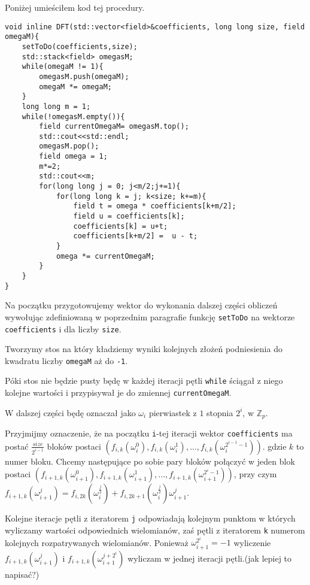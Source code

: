 \documentclass{article}
\begin{document}
Poniżej umieściłem kod tej procedury.

\begin{verbatim}
void inline DFT(std::vector<field>&coefficients, long long size, field omegaM){
    setToDo(coefficients,size);
    std::stack<field> omegasM;
    while(omegaM != 1){
        omegasM.push(omegaM);
        omegaM *= omegaM;
    }
    long long m = 1;
    while(!omegasM.empty()){   
        field currentOmegaM= omegasM.top();
        std::cout<<std::endl;
        omegasM.pop();
        field omega = 1;
        m*=2;
        std::cout<<m;
        for(long long j = 0; j<m/2;j+=1){
            for(long long k = j; k<size; k+=m){
                field t = omega * coefficients[k+m/2];
                field u = coefficients[k];
                coefficients[k] = u+t;
                coefficients[k+m/2] =  u - t;
            }
            omega *= currentOmegaM;
        }
    }
}
\end{verbatim}



Na początku przygotowujemy wektor do wykonania dalszej części obliczeń wywołując zdefiniowaną w poprzednim paragrafie funkcję \texttt{setToDo} na wektorze 
\texttt{coefficients} i dla liczby \texttt{size}. 

Tworzymy stos na który kładziemy wyniki kolejnych złożeń podniesienia do kwadratu liczby \texttt{omegaM} aż do \texttt{-1}.

Póki stos nie będzie pusty będę w każdej iteracji pętli \texttt{while} ściągał z niego kolejne wartości i przypisywał je do zmiennej \texttt{currentOmegaM}.

W dalszej części będę oznaczał jako $\omega_i$ pierwiastek z $1$ stopnia $2^i$, w $\mathbb{Z}_p$.

Przyjmijmy oznaczenie, że na początku \texttt{i}-tej iteracji wektor \texttt{coefficients} ma postać $\frac{size}{2^{i-1}}$ bloków postaci
$(f_{i,k}(\omega_i^0), f_{i,k}(\omega_i^1), ...,f_{i,k}(\omega^{2^{i-1}-1}_i))$. gdzie $k$ to numer bloku. Chcemy
następujące po sobie pary bloków połączyć w jeden blok postaci $(f_{i+1,k}(\omega_{i+1}^0),f_{i+1,k}(\omega_{i+1}^1),...,
f_{i+1,k}(\omega^{2^{i}-1}_{i+1}))$, przy czym 
$f_{i+1,k}(\omega_{i+1}^j) = f_{i,2k}(\omega_{i}^\frac{j}{2})+f_{i,2k+1}(\omega_{i}^{\frac{j}{2}})\omega_{i+1}^j$. 

Kolejne iteracje pętli z iteratorem \texttt{j} odpowiadają kolejnym punktom w których wyliczamy wartości odpowiednich wielomianów, zaś pętli z iteratorem 
\texttt{k}
numerom kolejnych rozpatrywanych wielomianów. Ponieważ $\omega_{i+1}^{2^i}=-1$ wyliczenie $f_{i+1,k}(\omega_{i+1}^{j})$ i $f_{i+1,k}(\omega_{i+1}^{j+2^i})$ 
wyliczam w jednej iteracji pętli.(jak lepiej to napisać?)
\end{document}
